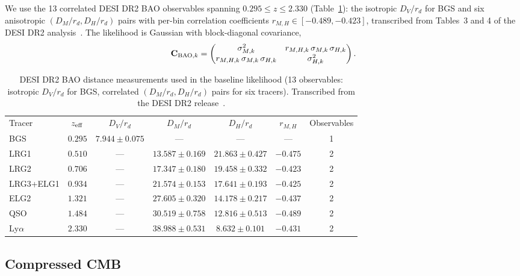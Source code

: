 \documentclass[aps,prd,twocolumn,superscriptaddress,nofootinbib]{revtex4-2}
\begin{document}
We use the 13 correlated DESI DR2 BAO observables spanning $0.295 \le z \le 2.330$ (Table~\ref{tab:bao}): the isotropic $D_V/r_d$ for BGS and six anisotropic $(D_M/r_d, D_H/r_d)$ pairs with per-bin correlation coefficients $r_{M,H} \in [-0.489, -0.423]$, transcribed from Tables~3 and 4 of the DESI DR2 analysis~\cite{DESI2025}. The likelihood is Gaussian with block-diagonal covariance,
\begin{equation}
\mathbf{C}_{{\rm BAO},k} = \begin{pmatrix} \sigma_{M,k}^2 & r_{M,H,k}\,\sigma_{M,k}\,\sigma_{H,k} \\ r_{M,H,k}\,\sigma_{M,k}\,\sigma_{H,k} & \sigma_{H,k}^2 \end{pmatrix}.
\label{eq:cov}
\end{equation}

\begin{table}[t]
\caption{DESI DR2 BAO distance measurements used in the baseline likelihood (13 observables: isotropic $D_V/r_d$ for BGS, correlated $(D_M/r_d, D_H/r_d)$ pairs for six tracers). Transcribed from the DESI DR2 release~\cite{DESI2025}.}
\label{tab:bao}
\begin{ruledtabular}
\begin{tabular}{lcccccc}
Tracer & $z_{\rm eff}$ & $D_V/r_d$ & $D_M/r_d$ & $D_H/r_d$ & $r_{M,H}$ & Observables \\
\colrule
BGS & $0.295$ & $7.944 \pm 0.075$ & --- & --- & --- & 1 \\
LRG1 & $0.510$ & --- & $13.587 \pm 0.169$ & $21.863 \pm 0.427$ & $-0.475$ & 2 \\
LRG2 & $0.706$ & --- & $17.347 \pm 0.180$ & $19.458 \pm 0.332$ & $-0.423$ & 2 \\
LRG3+ELG1 & $0.934$ & --- & $21.574 \pm 0.153$ & $17.641 \pm 0.193$ & $-0.425$ & 2 \\
ELG2 & $1.321$ & --- & $27.605 \pm 0.320$ & $14.178 \pm 0.217$ & $-0.437$ & 2 \\
QSO & $1.484$ & --- & $30.519 \pm 0.758$ & $12.816 \pm 0.513$ & $-0.489$ & 2 \\
Ly$\alpha$ & $2.330$ & --- & $38.988 \pm 0.531$ & $8.632 \pm 0.101$ & $-0.431$ & 2 \\
\end{tabular}
\end{ruledtabular}
\end{table}

\subsection{Compressed CMB}
\end{document}
